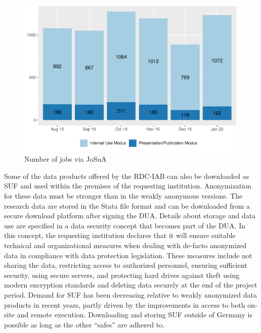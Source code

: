 \begin{figure}
\centering
\includegraphics{./figures/iabfigure1.pdf}
\caption{\label{fig:iabfig1}Number of jobs via JoSuA}
\end{figure}

Some of the data products offered by the RDC-IAB can also be downloaded as SUF and used within the premises of the requesting institution. Anonymization for these data must be stronger than in the weakly anonymous versions. The research data are stored in the Stata file format and can be downloaded from a secure download platform after signing the DUA. Details about storage and data use are specified in a data security concept that becomes part of the DUA. In this concept, the requesting institution declares that it will ensure suitable technical and organizational measures when dealing with de-facto anonymized data in compliance with data protection legislation. These measures include not sharing the data, restricting access to authorized personnel, ensuring sufficient security, using secure servers, and protecting hard drives against theft using modern encryption standards and deleting data securely at the end of the project period. Demand for SUF has been decreasing relative to weakly anonymized data products in recent years, partly driven by the improvements in access to both on-site and remote execution. Downloading and storing SUF outside of Germany is possible as long as the other ``safes'' are adhered to.

